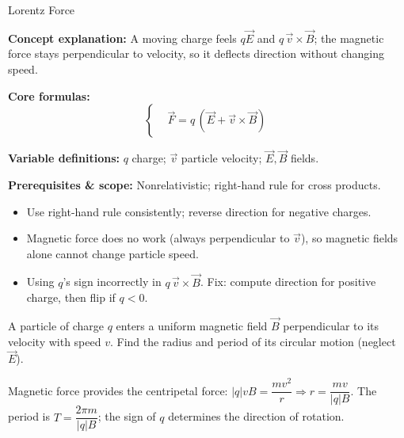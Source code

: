 \label{unit:magnetism}

\begin{KnowledgePoint}{Lorentz Force \Core}
  \KPFormulas
  \begin{formulabox}
  \textbf{Concept explanation:} A moving charge feels $q\vec E$ and $q\,\vec v\times\vec B$; the magnetic force stays perpendicular to velocity, so it deflects direction without changing speed.

  \textbf{Core formulas:}
  \[
  \left\{\begin{aligned}
    &\vec F=q\,(\vec E+\vec v\times\vec B)
  \end{aligned}\right.
  \]

  \textbf{Variable definitions:} $q$ charge; $\vec v$ particle velocity; $\vec E,\vec B$ fields.

\textbf{Prerequisites \& scope:} Nonrelativistic; right-hand rule for cross products.
  \end{formulabox}

  \KPHeuristics
  \begin{heuristicsbox}
  \begin{itemize}[leftmargin=*]
    \item Use right-hand rule consistently; reverse direction for negative charges.
    \item Magnetic force does no work (always perpendicular to $\vec v$), so magnetic fields alone cannot change particle speed.
  \end{itemize}
  \vspace{0.4em}
  \begin{itemize}[leftmargin=*]
    \item Using $q$'s sign incorrectly in $q\,\vec v\times\vec B$. Fix: compute direction for positive charge, then flip if $q<0$.
  \end{itemize}
  \end{heuristicsbox}

  \KPProblems
  \begin{cheatproblem}
  A particle of charge $q$ enters a uniform magnetic field $\vec B$ perpendicular to its velocity with speed $v$. Find the radius and period of its circular motion (neglect $\vec E$).
  \begin{solutionbox}
  Magnetic force provides the centripetal force: $|q|vB=\dfrac{mv^2}{r}\Rightarrow r=\dfrac{mv}{|q|B}$. The period is $T=\dfrac{2\pi m}{|q|B}$; the sign of $q$ determines the direction of rotation.
  \end{solutionbox}
  \end{cheatproblem}
\end{KnowledgePoint}

